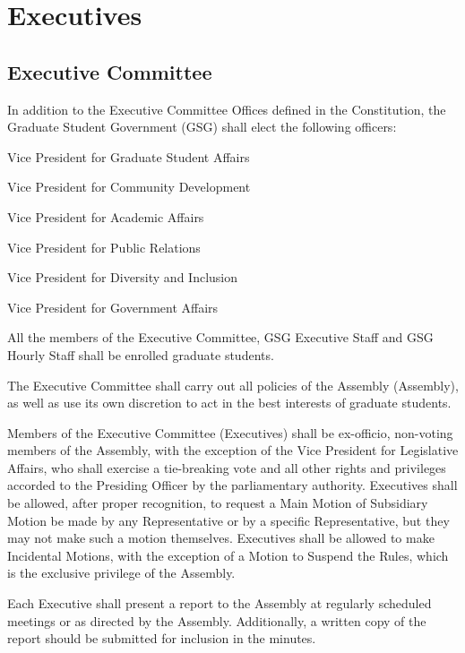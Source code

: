 \chapter{Executives}

\section{Executive Committee}
\begin{bylaws-number}
  \item In addition to the Executive Committee Offices defined in the Constitution, the Graduate Student Government (GSG) shall elect the following officers:
  \begin{bylaws-number}
    \item Vice President for Graduate Student Affairs
    \item Vice President for Community Development
    \item Vice President for Academic Affairs
    \item Vice President for Public Relations
    \item Vice President for Diversity and Inclusion
    \item Vice President for Government Affairs
  \end{bylaws-number}
  \item All the members of the Executive Committee, GSG Executive Staff and GSG Hourly Staff shall be enrolled graduate students.
  \item The Executive Committee shall carry out all policies of the Assembly (Assembly), as well as use its own discretion to act in the best interests of graduate students.
  \item Members of the Executive Committee (Executives) shall be ex-officio, non-voting members of the Assembly, with the exception of the Vice President for Legislative Affairs, who shall exercise a tie-breaking vote and all other rights and privileges accorded to the Presiding Officer by the parliamentary authority. Executives shall be allowed, after proper recognition, to request a Main Motion of Subsidiary Motion be made by any Representative or by a specific Representative, but they may not make such a motion themselves. Executives shall be allowed to make Incidental Motions, with the exception of a Motion to Suspend the Rules, which is the exclusive privilege of the Assembly.
  \item Each Executive shall present a report to the Assembly at regularly scheduled meetings or as directed by the Assembly. Additionally, a written copy of the report should be submitted for inclusion in the minutes.

\end{bylaws-number}
